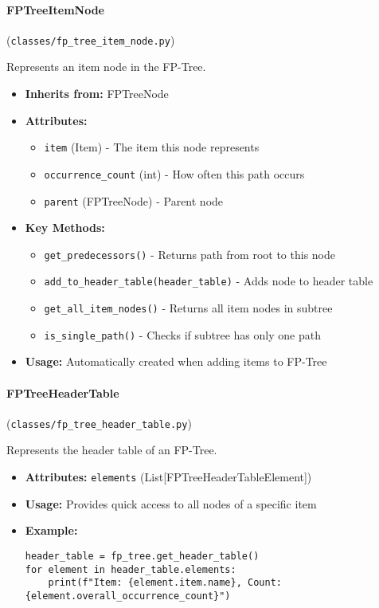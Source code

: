 \documentclass[
english,
smallborders
]{i6prcsht}
\begin{document}
\vspace*{0.3cm}

\paragraph{FPTreeItemNode} (\texttt{classes/fp\_tree\_item\_node.py})

Represents an item node in the FP-Tree.

\begin{itemize}
	\item \textbf{Inherits from:} FPTreeNode
	\item \textbf{Attributes:}
	      \begin{itemize}
		      \item \texttt{item} (Item) - The item this node represents
		      \item \texttt{occurrence\_count} (int) - How often this path occurs
		      \item \texttt{parent} (FPTreeNode) - Parent node
	      \end{itemize}
	\item \textbf{Key Methods:}
	      \begin{itemize}
		      \item \texttt{get\_predecessors()} - Returns path from root to this node
		      \item \texttt{add\_to\_header\_table(header\_table)} - Adds node to header table
		      \item \texttt{get\_all\_item\_nodes()} - Returns all item nodes in subtree
		      \item \texttt{is\_single\_path()} - Checks if subtree has only one path
	      \end{itemize}
	\item \textbf{Usage:} Automatically created when adding items to FP-Tree
\end{itemize}

\vspace*{0.3cm}

\paragraph{FPTreeHeaderTable} (\texttt{classes/fp\_tree\_header\_table.py})

Represents the header table of an FP-Tree.

\begin{itemize}
	\item \textbf{Attributes:} \texttt{elements} (List[FPTreeHeaderTableElement])
	\item \textbf{Usage:} Provides quick access to all nodes of a specific item
	\item \textbf{Example:}
	      \begin{lstlisting}
header_table = fp_tree.get_header_table()
for element in header_table.elements:
    print(f"Item: {element.item.name}, Count: {element.overall_occurrence_count}")
    \end{lstlisting}
\end{itemize}
\end{document}
